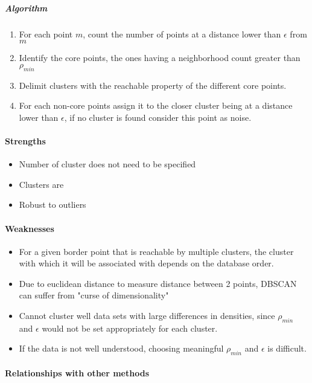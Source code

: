 \subparagraph{Algorithm}
\begin{enumerate}
    \item For each point $m$, count the number of points at a distance lower than $\epsilon$ from $m$
    \item Identify the core points, the ones having a neighborhood count greater than $\rho_{min}$
    \item Delimit clusters with the reachable property of the different core points.
    \item For each non-core points assign it to the closer cluster being at a distance lower than
        $\epsilon$, if no cluster is found consider this point as noise.
\end{enumerate}


\paragraph{Strengths}
\begin{itemize}
    \item Number of cluster does not need to be specified
    \item Clusters are 
    \item Robust to outliers
\end{itemize}

\paragraph{Weaknesses}
\begin{itemize}
    \item For a given border point that is reachable by multiple clusters, the cluster with which 
        it will be associated with depends on the database order.
    \item Due to euclidean distance to measure distance between 2 points, DBSCAN can suffer from 
        "curse of dimensionality"
    \item Cannot cluster well data sets with large differences in densities, since $\rho_{min}$ and
        $\epsilon$ would not be set appropriately for each cluster.
    \item If the data is not well understood, choosing meaningful $\rho_{min}$ and $\epsilon$
        is difficult.
\end{itemize}

\paragraph{Relationships with other methods}
